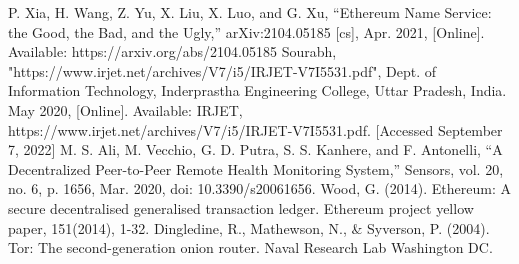 \documentclass{article}
\begin{document}
P. Xia, H. Wang, Z. Yu, X. Liu, X. Luo, and G. Xu, “Ethereum Name Service: the Good, the Bad, and the Ugly,” arXiv:2104.05185 [cs], Apr. 2021, [Online]. Available: https://arxiv.org/abs/2104.05185
\newline\newline
Sourabh, "https://www.irjet.net/archives/V7/i5/IRJET-V7I5531.pdf", Dept. of Information Technology, Inderprastha Engineering College, Uttar Pradesh, India. May 2020, [Online]. Available: IRJET, https://www.irjet.net/archives/V7/i5/IRJET-V7I5531.pdf. [Accessed September 7, 2022]
\newline\newline
M. S. Ali, M. Vecchio, G. D. Putra, S. S. Kanhere, and F. Antonelli, “A Decentralized Peer-to-Peer Remote Health Monitoring System,” Sensors, vol. 20, no. 6, p. 1656, Mar. 2020, doi: 10.3390/s20061656. 
\newline\newline
Wood, G. (2014). Ethereum: A secure decentralised generalised transaction ledger. Ethereum project yellow paper, 151(2014), 1-32.
\newline\newline
Dingledine, R., Mathewson, N., & Syverson, P. (2004). Tor: The second-generation onion router. Naval Research Lab Washington DC.
\end{document}
